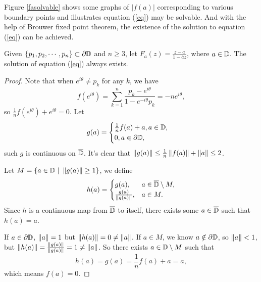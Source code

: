 \documentclass[review,onefignum,onetabnum]{siamonline190516}
\begin{document}
    Figure \ref{fasolvable} shows some graphs of $|f(a)|$ corresponding to various boundary points and illustrates equation (\ref{eq}) may be solvable. And with the help of Brouwer fixed point theorem, the existence of the solution to equation (\ref{eq}) can be achieved.

    \begin{theorem}\label{existence}
        Given $\{p_1, p_2, \cdots, p_n\} \subset \partial \mathbb{D}$ and $n \ge 3$, let $F_a(z) = \frac{z - a}{1 - \overline{a}z}$, where $a \in \mathbb{D}$. The solution of equation (\ref{eq}) always exists.
    \end{theorem}

    \begin{proof}
        Note that when $e^{i \theta} \neq p_k$ for any $k$, we have
        \begin{equation*}
            f(e^{i \theta}) = \sum_{k=1}^n \frac{p_k - e^{i \theta}}{1 - e^{-i\theta}p_k} = - n e^{i\theta},
        \end{equation*}
        so $\frac{1}{n} f(e^{i\theta}) + e^{i \theta} = 0$. Let 
        \begin{equation*}
            g(a) = \begin{cases}
        \frac{1}{n} f(a) + a, a \in \mathbb{D},\\
        0, a \in \partial \mathbb{D},
        \end{cases}
        \end{equation*}
        such $g$ is continuous on $\overline{\mathbb{D}}$. It's clear that $\left\Vert g(a) \right\Vert \le \frac{1}{n} \left\Vert f(a) \right\Vert + \left\Vert a \right\Vert \le 2$.
        
        Let $M = \{a \in \mathbb{D} ~|~ \left\Vert g(a) \right\Vert \ge 1 \}$, we define
        \begin{equation*}
            h(a) = \begin{cases}
            g(a), &a \in  \overline{\mathbb{D}} \setminus M,\\
            \frac{g(a)}{\left\Vert g(a) \right\Vert}, &a \in  M.
        \end{cases}
        \end{equation*}
        Since $h$ is a continuous map from $\overline{\mathbb{D}}$ to itself, there exists some $a \in \overline{\mathbb{D}}$ such that $h(a) = a$.
        
        If $a \in \partial \mathbb{D}$, $\left\Vert a \right\Vert = 1$ but $\left\Vert h(a) \right\Vert = 0 \neq \left\Vert a \right\Vert$. If $a \in M$, we know $a \notin \partial \mathbb{D}$, so $\left\Vert a \right\Vert < 1$, but $\left\Vert h(a) \right\Vert = \frac{\left\Vert g(a) \right\Vert}{\left\Vert g(a) \right\Vert} = 1 \neq \left\Vert a \right\Vert$. So there exists $a \in \mathbb{D} \setminus M$ such that 
        \begin{equation*}
            h(a) = g(a) = \frac{1}{n}f(a) + a = a,
        \end{equation*}
        which means $f(a) = 0$.
    \end{proof}
\end{document}
